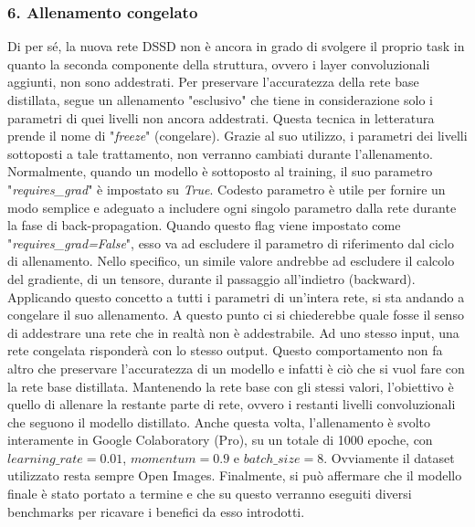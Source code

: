 \subsubsection{6. Allenamento congelato}
Di per sé, la nuova rete DSSD non è ancora in grado di svolgere il proprio 
task in quanto la seconda componente della struttura, ovvero i layer convoluzionali 
aggiunti, non sono addestrati. Per preservare l'accuratezza della rete 
base distillata, segue un allenamento "esclusivo" che tiene in considerazione 
solo i parametri di quei livelli non ancora addestrati. Questa tecnica in 
letteratura prende il nome di "\emph{freeze}" (congelare). Grazie al suo utilizzo, i 
parametri dei livelli sottoposti a tale trattamento, non verranno cambiati 
durante l'allenamento. Normalmente, quando un modello è sottoposto al 
training, il suo parametro "\emph{requires\_grad}" è impostato su \emph{True}. Codesto 
parametro è utile per fornire un modo semplice e adeguato a includere ogni 
singolo parametro dalla rete durante la fase di back-propagation. Quando 
questo flag viene impostato come "\emph{requires\_grad=False}", esso va ad 
escludere il parametro di riferimento dal ciclo di allenamento. Nello specifico, 
un simile valore andrebbe ad escludere il calcolo del gradiente, di un 
tensore, durante il passaggio all'indietro (backward). Applicando questo 
concetto a tutti i parametri di un'intera rete, si sta andando a congelare il 
suo allenamento. A questo punto ci si chiederebbe quale fosse il senso di 
addestrare una rete che in realtà non è addestrabile. Ad uno stesso input, 
una rete congelata risponderà con lo stesso output. Questo comportamento 
non fa altro che preservare l'accuratezza di un modello e infatti è ciò che 
si vuol fare con la rete base distillata. Mantenendo la rete base con gli 
stessi valori, l'obiettivo è quello di allenare la restante parte di rete, ovvero i 
restanti livelli convoluzionali che seguono il modello distillato. Anche questa 
volta, l'allenamento è svolto interamente in Google Colaboratory (Pro), su 
un totale di 1000 epoche, con $learning\_rate=0.01$, $momentum=0.9$ 
e $batch\_size=8$. Ovviamente il dataset utilizzato resta sempre Open 
Images. Finalmente, si può affermare che il modello finale è stato portato a 
termine e che su questo verranno eseguiti diversi benchmarks per ricavare i 
benefici da esso introdotti.  

